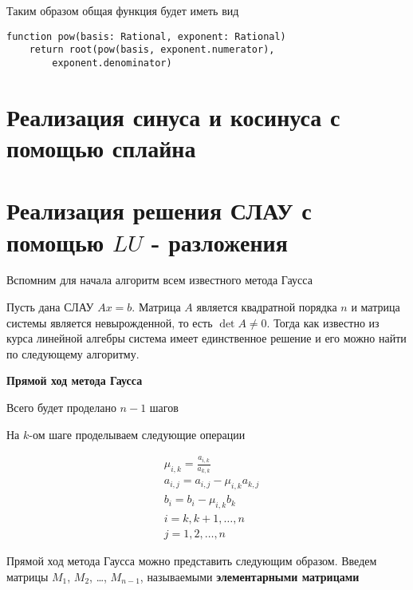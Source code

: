 \documentclass[a4paper,article,14pt]{extarticle}
\begin{document}
Таким образом общая функция будет иметь вид

\begin{lstlisting}
function pow(basis: Rational, exponent: Rational)
    return root(pow(basis, exponent.numerator), 
        exponent.denominator)
\end{lstlisting}

\newpage

\section{Реализация синуса и косинуса с помощью сплайна}


\newpage

\section{Реализация решения СЛАУ с помощью $LU$ - разложения}

Вспомним для начала алгоритм всем известного метода Гаусса \cite{item1}

Пусть дана СЛАУ $Ax = b$.
Матрица $A$ является квадратной порядка $n$
и матрица системы является невырожденной, то есть
$ \det A  \neq 0 $. Тогда как известно из курса линейной
алгебры система имеет единственное решение и его можно найти
по следующему алгоритму.

\textbf{Прямой ход метода Гаусса}

Всего будет проделано $ n - 1 $ шагов


На $k$-ом шаге проделываем следующие операции

\begin{equation}
    \begin{split}
        &\mu_{i, k} = \frac{a_{i, k}}{a_{k, k}} \\
        &a_{i, j} = a_{i, j} - \mu_{i, k} a_{k, j} \\
        &b_i = b_i - \mu_{i, k}b_k \\
        & i = k, k + 1, \dots, n \\
        & j = 1, 2, \dots, n
    \end{split}
\end{equation}


Прямой ход метода Гаусса можно представить следующим образом. \cite{item1}
Введем матрицы $M_1$, $M_2$, \dots, $M_{n - 1}$, называемыми \textbf{элементарными матрицами}
\end{document}
